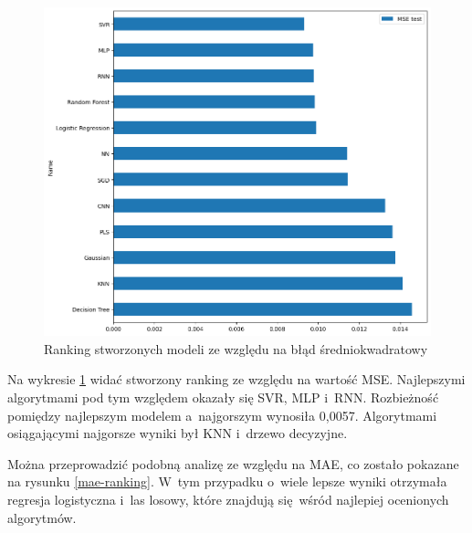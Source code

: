 \begin{figure}[H]
    \centering
    \includegraphics[width=\textwidth]{images/mse_ranking.png}
    \caption[Ranking ze względu na MSE]{Ranking stworzonych modeli ze względu na błąd średniokwadratowy}
    \label{mse-ranking}
\end{figure}

Na wykresie \ref{mse-ranking} widać stworzony ranking ze względu na wartość MSE.
Najlepszymi algorytmami pod tym względem okazały się SVR, MLP i~RNN. Rozbieżność 
pomiędzy najlepszym modelem a~najgorszym wynosiła 0,0057. Algorytmami 
osiągającymi najgorsze wyniki był KNN i~drzewo decyzyjne.

Można przeprowadzić podobną analizę ze względu na MAE, co zostało pokazane na 
rysunku \ref{mae-ranking}. W~tym przypadku o~wiele lepsze wyniki 
otrzymała regresja logistyczna i~las losowy, które znajdują się wśród najlepiej 
ocenionych algorytmów.

